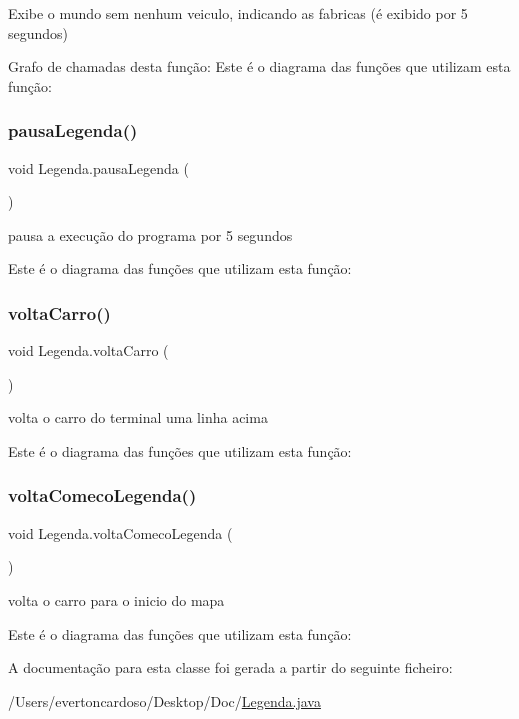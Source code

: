 Exibe o mundo sem nenhum veiculo, indicando as fabricas (é exibido por 5 segundos) 

Grafo de chamadas desta função\+:
Este é o diagrama das funções que utilizam esta função\+:
\mbox{\label{class_legenda_a30586aa3859ac3880a8f5d2acc7a5cb5}} 
\subsubsection{\texorpdfstring{pausa\+Legenda()}{pausaLegenda()}}
{\footnotesize\ttfamily void Legenda.\+pausa\+Legenda (\begin{DoxyParamCaption}{ }\end{DoxyParamCaption})}



pausa a execução do programa por 5 segundos 

Este é o diagrama das funções que utilizam esta função\+:
\mbox{\label{class_legenda_ad2b8f204bbb24bf96a198f5e76e908fe}} 
\subsubsection{\texorpdfstring{volta\+Carro()}{voltaCarro()}}
{\footnotesize\ttfamily void Legenda.\+volta\+Carro (\begin{DoxyParamCaption}{ }\end{DoxyParamCaption})}



volta o carro do terminal uma linha acima 

Este é o diagrama das funções que utilizam esta função\+:
\mbox{\label{class_legenda_a0c879e1772bd84a55e9c1cca7d5678dc}} 
\subsubsection{\texorpdfstring{volta\+Comeco\+Legenda()}{voltaComecoLegenda()}}
{\footnotesize\ttfamily void Legenda.\+volta\+Comeco\+Legenda (\begin{DoxyParamCaption}{ }\end{DoxyParamCaption})}



volta o carro para o inicio do mapa 

Este é o diagrama das funções que utilizam esta função\+:


A documentação para esta classe foi gerada a partir do seguinte ficheiro\+:\begin{DoxyCompactItemize}
\item 
/\+Users/evertoncardoso/\+Desktop/\+Doc/\mbox{\hyperlink{_legenda_8java}{Legenda.\+java}}\end{DoxyCompactItemize}
